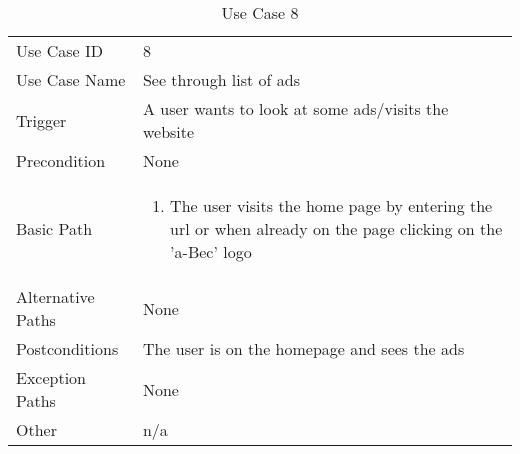 \begin{table}[H]
\centering
\label{table-use-case-8}
\begin{tabular}{|p{3cm}|p{10cm}}
Use Case ID       & 8                                                           
\\
Use Case Name     & See through list of ads                                                         
\\
Trigger           & A user wants to look at some ads/visits the website                                          
\\
Precondition      & None                                                 
\\
Basic Path        & \begin{enumerate}
\item The user visits the home page by entering the url or when already on the
page clicking on the 'a-Bec' logo
\end{enumerate} 
     \\
Alternative Paths & None                          \\
Postconditions    & The user is on the homepage and sees the ads                                                          
\\
Exception Paths   & None                          \\
Other             & n/a                                                                                                                                                                                                        
\end{tabular}
\caption{Use Case 8}
\end{table}


